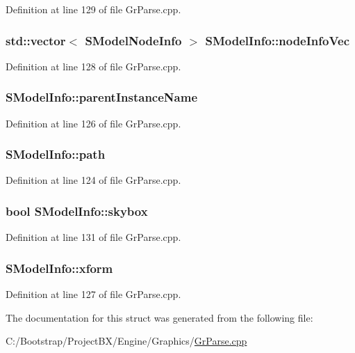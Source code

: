 Definition at line 129 of file GrParse.cpp.\hypertarget{struct_s_model_info_cd0eda8de59d6aa049d5afaa851a1d82}{
\subsubsection[{nodeInfoVec}]{\setlength{\rightskip}{0pt plus 5cm}std::vector$<$ {\bf SModelNodeInfo} $>$ {\bf SModelInfo::nodeInfoVec}}}
\label{struct_s_model_info_cd0eda8de59d6aa049d5afaa851a1d82}




Definition at line 128 of file GrParse.cpp.\hypertarget{struct_s_model_info_95660e555e8990625772b3f5744639fd}{
\subsubsection[{parentInstanceName}]{ {\bf SModelInfo::parentInstanceName}}}
\label{struct_s_model_info_95660e555e8990625772b3f5744639fd}




Definition at line 126 of file GrParse.cpp.\hypertarget{struct_s_model_info_420add05541cbfe326890c918be61265}{
\subsubsection[{path}]{ {\bf SModelInfo::path}}}
\label{struct_s_model_info_420add05541cbfe326890c918be61265}




Definition at line 124 of file GrParse.cpp.\hypertarget{struct_s_model_info_07a5eabdc7679e76a537d055d1263fe8}{
\subsubsection[{skybox}]{\setlength{\rightskip}{0pt plus 5cm}bool {\bf SModelInfo::skybox}}}
\label{struct_s_model_info_07a5eabdc7679e76a537d055d1263fe8}




Definition at line 131 of file GrParse.cpp.\hypertarget{struct_s_model_info_4938e01ec384c259e954268a7f4236cc}{
\subsubsection[{xform}]{ {\bf SModelInfo::xform}}}
\label{struct_s_model_info_4938e01ec384c259e954268a7f4236cc}




Definition at line 127 of file GrParse.cpp.

The documentation for this struct was generated from the following file:\begin{CompactItemize}
\item 
C:/Bootstrap/ProjectBX/Engine/Graphics/\hyperlink{_gr_parse_8cpp}{GrParse.cpp}\end{CompactItemize}
